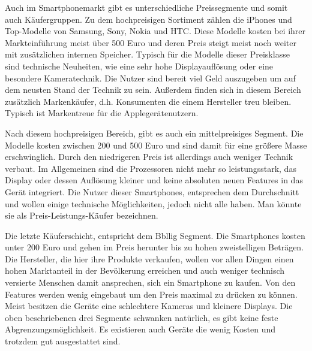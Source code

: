 Auch im Smartphonemarkt gibt es unterschiedliche Preissegmente und somit auch Käufergruppen. Zu dem hochpreisigen Sortiment zählen die iPhones und Top-Modelle von Samsung, Sony, Nokia  und HTC. Diese Modelle kosten bei ihrer Markteinführung meist über 500 Euro und deren Preis steigt meist noch weiter mit zusätzlichen internen Speicher. Typisch für die Modelle dieser Preisklasse sind technische Neuheiten, wie eine sehr hohe Displayauflösung oder eine besondere Kameratechnik. Die Nutzer sind bereit viel Geld auszugeben um auf dem neusten Stand der Technik zu sein. Außerdem finden sich in diesem Bereich zusätzlich Markenkäufer, d.h. Konsumenten die einem Hersteller treu bleiben. Typisch ist Markentreue für die Applegerätenutzern. 

Nach diesem hochpreisigen Bereich, gibt es auch ein mittelpreisiges Segment. Die Modelle kosten zwischen 200  und 500 Euro und  sind damit für eine größere Masse erschwinglich. Durch den niedrigeren Preis ist allerdings auch weniger Technik verbaut. Im Allgemeinen sind die Prozessoren nicht mehr so leistungsstark, das Display oder dessen Auflösung kleiner und keine absoluten neuen Features in das Gerät integriert. Die Nutzer dieser Smartphones, entsprechen dem Durchschnitt und wollen einige technische Möglichkeiten, jedoch nicht alle haben. Man könnte sie als Preis-Leistungs-Käufer bezeichnen.

Die letzte Käuferschicht, entspricht dem Bbllig Segment. Die Smartphones kosten unter 200 Euro und gehen im Preis herunter  bis zu hohen zweistelligen Beträgen. Die Hersteller, die hier ihre Produkte verkaufen, wollen vor allen Dingen einen hohen Marktanteil in der Bevölkerung erreichen und auch weniger technisch versierte Menschen damit ansprechen, sich ein Smartphone zu kaufen. Von den Features werden wenig eingebaut um den Preis maximal zu drücken zu können. Meist besitzen die Geräte eine schlechtere Kameras  und kleinere Displays.
Die oben beschriebenen drei Segmente schwanken natürlich, es gibt keine feste Abgrenzungsmöglichkeit. Es existieren auch Geräte die wenig Kosten und trotzdem gut ausgestattet sind.



